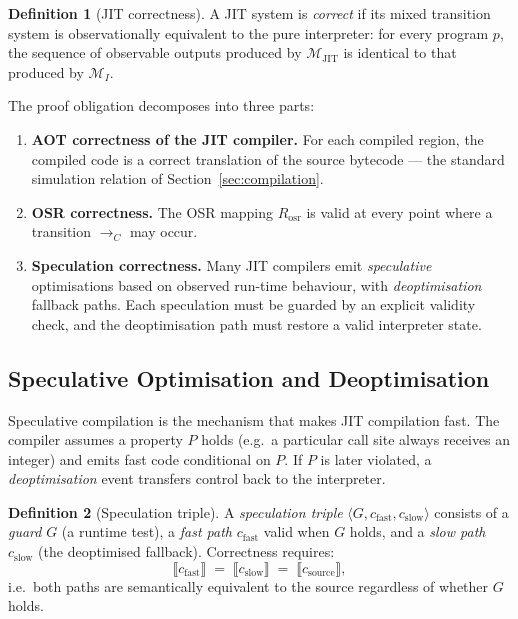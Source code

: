 \documentclass[11pt, a4paper]{article}
\theoremstyle{definition}
\newtheorem{definition}{Definition}[section]
\theoremstyle{plain}
\theoremstyle{remark}
\begin{document}
\begin{definition}[JIT correctness]
  A JIT system is \emph{correct} if its mixed transition system is
  observationally equivalent to the pure interpreter: for every program $p$,
  the sequence of observable outputs produced by
  $\mathcal{M}_{\mathrm{JIT}}$ is identical to that produced by
  $\mathcal{M}_I$.
\end{definition}

The proof obligation decomposes into three parts:

\begin{enumerate}
  \item \textbf{AOT correctness of the JIT compiler.} For each compiled
        region, the compiled code is a correct translation of the source
        bytecode --- the standard simulation relation of
        Section~\ref{sec:compilation}.
  \item \textbf{OSR correctness.} The OSR mapping $R_{\mathrm{osr}}$
        is valid at every point where a transition $\to_C$ may occur.
  \item \textbf{Speculation correctness.} Many JIT compilers emit
        \emph{speculative} optimisations based on observed run-time
        behaviour, with \emph{deoptimisation} fallback paths. Each
        speculation must be guarded by an explicit validity check, and the
        deoptimisation path must restore a valid interpreter state.
\end{enumerate}

\subsection{Speculative Optimisation and Deoptimisation}

Speculative compilation is the mechanism that makes JIT compilation fast.
The compiler assumes a property $P$ holds (e.g.\ a particular call site
always receives an integer) and emits fast code conditional on $P$. If $P$
is later violated, a \emph{deoptimisation} event transfers control back to
the interpreter.

\begin{definition}[Speculation triple]
  A \emph{speculation triple} $\langle G, c_{\mathrm{fast}}, c_{\mathrm{slow}}\rangle$
  consists of a \emph{guard} $G$ (a runtime test), a \emph{fast path}
  $c_{\mathrm{fast}}$ valid when $G$ holds, and a \emph{slow path}
  $c_{\mathrm{slow}}$ (the deoptimised fallback). Correctness requires:
  \[
    \llbracket c_{\mathrm{fast}} \rrbracket \;=\; \llbracket c_{\mathrm{slow}}
    \rrbracket \;=\; \llbracket c_{\mathrm{source}} \rrbracket,
  \]
  i.e.\ both paths are semantically equivalent to the source regardless of
  whether $G$ holds.
\end{definition}
\end{document}
